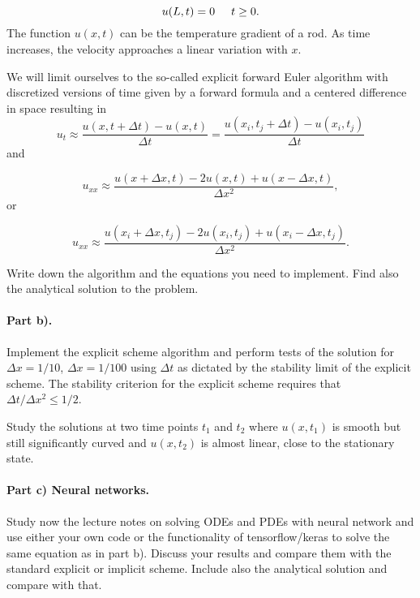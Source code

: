 \documentclass[%
oneside,                 %
final,                   %
10pt]{article}
\begin{document}
\begin{equation*}
u(L,t)= 0 \hspace{0.5cm} t \ge 0.
\end{equation*}
The function $u(x,t)$  can be the temperature gradient of a  rod.
As time increases, the velocity approaches a linear variation with $x$. 

We will limit ourselves to the so-called explicit forward Euler algorithm with discretized versions of time given by a forward formula and a centered difference in space resulting in   
\begin{equation*} 
u_t\approx \frac{u(x,t+\Delta t)-u(x,t)}{\Delta t}=\frac{u(x_i,t_j+\Delta t)-u(x_i,t_j)}{\Delta t}
\end{equation*}
and

\begin{equation*}
u_{xx}\approx \frac{u(x+\Delta x,t)-2u(x,t)+u(x-\Delta x,t)}{\Delta x^2},
\end{equation*}
or

\begin{equation*}
u_{xx}\approx \frac{u(x_i+\Delta x,t_j)-2u(x_i,t_j)+u(x_i-\Delta x,t_j)}{\Delta x^2}.
\end{equation*}

Write down the algorithm and the equations you need to implement.
Find also the analytical solution to the problem. 

\paragraph{Part b).}
Implement the explicit scheme  algorithm and perform tests of the solution 
for $\Delta x=1/10$, $\Delta x=1/100$ using  $\Delta t$ as dictated by the stability limit of the explicit scheme. The stability criterion for the explicit scheme requires that $\Delta t/\Delta x^2 \leq 1/2$. 

Study the solutions at two time points $t_1$ and $t_2$ where $u(x,t_1)$ is smooth but still significantly curved
and $u(x,t_2)$ is almost linear, close to the stationary state.

\paragraph{Part c) Neural networks.}
Study now the lecture notes on solving ODEs and PDEs with neural
network and use either your own code or the
functionality of tensorflow/keras to solve the same equation as in
part b).  Discuss your results and compare them with the standard
explicit or implicit scheme. Include also the analytical solution and compare with
that.
\end{document}

